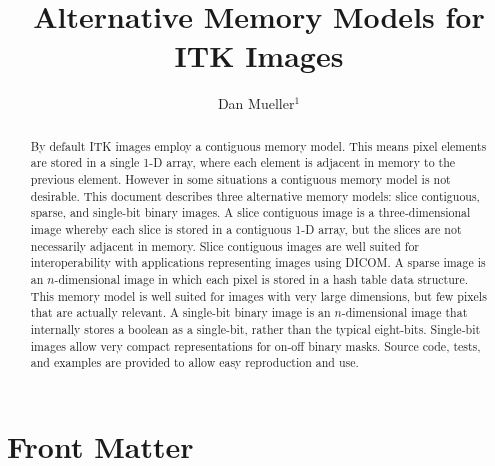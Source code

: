 \documentclass{InsightArticle}
\title{Alternative Memory Models for ITK Images}
\author{Dan Mueller$^{1}$}
\newcommand{\IJhandlerIDnumber}{3068}
\begin{document}
\IJhandlefooter{\IJhandlerIDnumber}

\maketitle

\ifhtml
\chapter*{Front Matter\label{front}}
\fi


\begin{abstract}
\noindent
By default ITK images employ a contiguous memory model.
This means pixel elements are stored in a single 1-D array,
where each element is adjacent in memory to the previous element.
However in some situations a contiguous memory model is not desirable.
%
This document describes three alternative memory models: slice contiguous,
sparse, and single-bit binary images.
%
A slice contiguous image is a three-dimensional image whereby each
slice is stored in a contiguous 1-D array, but the slices are not
necessarily adjacent in memory.
Slice contiguous images are well suited for interoperability with
applications representing images using DICOM.
%
A sparse image is an $n$-dimensional image in which each pixel is stored
in a hash table data structure.
This memory model is well suited for images with very large dimensions,
but few pixels that are actually relevant.
%
A single-bit binary image is an $n$-dimensional image that internally
stores a boolean as a single-bit, rather than the typical eight-bits.
Single-bit images allow very compact representations for on-off binary masks.
%
Source code, tests, and examples are provided to allow easy reproduction
and use.

\end{abstract}

\IJhandlenote{\IJhandlerIDnumber}

\tableofcontents
\end{document}

